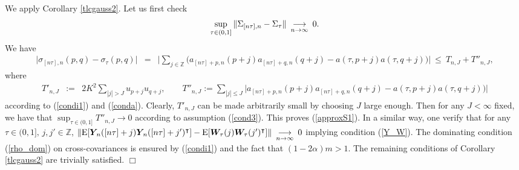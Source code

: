 \documentclass[10pt]{article}
\def\Z{\mathbb{Z}}
\def\E{\mathrm E}
\newcommand{\mbf}[1]{\mbox{\boldmath $#1$}}
\def\limiten{\renewcommand{\arraystretch}{0.5}
\begin{array}[t]{c}
\stackrel{}{\longrightarrow} \\
{\scriptstyle n\rightarrow\infty}
\end{array}\renewcommand{\arraystretch}{1}}
\begin{document}
 We apply Corollary \ref{tlcgauss2}. Let us first check
\begin{equation} \label{approxS1}
\sup_{\tau \in (0,1]}\|\Sigma_{[n \tau],n} - \Sigma_\tau \| \limiten   0.
\end{equation}
We have
\begin{eqnarray*}
\big|\sigma_{[n\tau],n}(p,q) - \sigma_\tau (p,q)\big|&=&
\Big|\sum_{j \in \Z} \big(a_{[n \tau] +p,n}(p+j) a_{[n \tau]+ q,n} (q +j) - a(\tau, p+j) a(\tau, q +j)\big)\Big| \ \le \ T_{n,J} + T''_{n,J},
\end{eqnarray*}
where
\begin{eqnarray*}
T'_{n,J}&:=&2K^2\sum_{|j| > J}u_{p+j} u_{q+j}, \qquad T''_{n,J} :=  \sum_{|j| \le J} \big|a_{[n \tau] +p,n}(p+j) a_{[n \tau]+ q,n} (q +j) - a(\tau, p+j) a(\tau, q +j)\big)\big|
\end{eqnarray*}
according to (\ref{condi1}) and (\ref{conda}). Clearly, $T'_{n,J}$ can be made arbitrarily small by choosing $J$ large enough. Then
for any $J < \infty$ fixed, we have that $\sup_{\tau \in (0,1]} T''_{n,J} \to 0 $ according to assumption (\ref{cond3}). This proves
(\ref{approxS1}). In a similar way, one verify that for any $\tau \in (0,1], \, j, j' \in \Z$,
$\|\E [ {\mbf Y}_{\! n}([n\tau] +j) {\mbf Y}_{\! n}([n\tau] + j')^\intercal] -
\E [{\mbf W}_{\!\tau}(j) {\mbf W}_{\!\tau}(j')^\intercal ]\| \limiten   0 $ implying condition (\ref{Y_W}). The dominating
condition (\ref{rho_dom}) on cross-covariances is ensured by (\ref{condi1}) and the fact that $(1-2\alpha) m > 1$. The remaining
conditions of  Corollary \ref{tlcgauss2} are trivially satisfied. \hfill   $\Box $ \\
\end{document}
